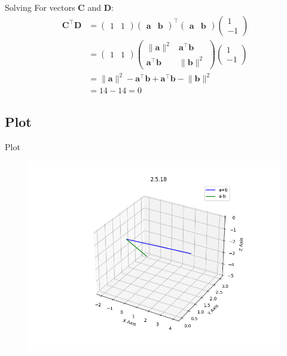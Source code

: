 \documentclass{beamer}
\theoremstyle{remark}
\providecommand{\norm}[1]{\lVert#1\rVert}
\newcommand{\myvec}[1]{\ensuremath{\begin{pmatrix}#1\end{pmatrix}}}
\let\vec\mathbf
\numberwithin{equation}{section}
\begin{document}
\begin{frame}{Solving}
For vectors $\vec{C}$ and $\vec{D}$:
\begin{align}
 \vec{C}^\top\vec{D} &= \myvec{1 & 1}\myvec{\vec{a} & \vec{b}}^\top\myvec{\vec{a} & \vec{b}}\myvec{1 \\ -1} \\
 &= \myvec{1 & 1}\myvec{\norm{\vec{a}}^2 & \vec{a}^\top\vec{b} \\ \vec{a}^\top\vec{b} & \norm{\vec{b}}^2}\myvec{1 \\ -1} \\
 &= \norm{\vec{a}}^2 - \vec{a}^\top\vec{b} + \vec{a}^\top\vec{b} - \norm{\vec{b}}^2 \\
 &= 14 - 14 = 0
\end{align}
\end{frame}

\subsection{Plot}
\begin{frame}{Plot}
 \begin{figure}[H]
    \centering
    \includegraphics[width=0.8\columnwidth]{../figs/plot.png}
    \caption*{}
    \label{fig:plot}
\end{figure}
\end{frame}
\end{document}
